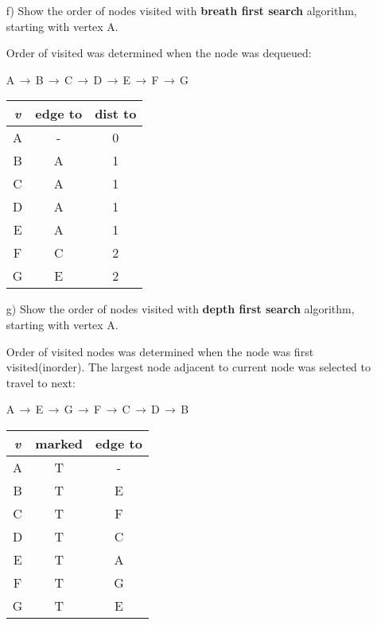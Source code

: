 \documentclass{article}
\begin{document}
\begin{itemize}
\begin{itemize}
        \item[f)] Show the order of nodes visited with \textbf{breath first search} algorithm, starting with vertex A.

        Order of visited was determined when the node was dequeued: 

        A$\,\to\,$B$\,\to\,$C$\,\to\,$D$\,\to\,$E$\,\to\,$F$\,\to\,$G

        \begin{centering}
            \begin{tabular}{|c|c|c|}
                \hline
                \emph{v} & edge to & dist to\\
                \hline
                A & - & 0\\
                \hline
                B & A & 1\\
                \hline
                C & A & 1\\
                \hline
                D & A & 1\\
                \hline
                E & A & 1\\
                \hline
                F & C & 2\\
                \hline
                G & E & 2\\
                \hline
            \end{tabular}
        \end{centering}
        
        \item[g)] Show the order of nodes visited with \textbf{depth first search} algorithm, starting with vertex A.

        Order of visited nodes was determined when the node was first visited(inorder).  The largest node adjacent to current node was selected to travel to next: 

        A$\,\to\,$E$\,\to\,$G$\,\to\,$F$\,\to\,$C$\,\to\,$D$\,\to\,$B

        \begin{centering}
            \begin{tabular}{|c|c|c|}
                \hline
                \emph{v} & marked & edge to\\
                \hline
                A & T & -\\
                \hline
                B & T & E\\
                \hline
                C & T & F\\
                \hline
                D & T & C\\
                \hline
                E & T & A\\
                \hline
                F & T & G\\
                \hline
                G & T & E\\
                \hline
            \end{tabular}
        \end{centering}
        
    \end{itemize}
\end{itemize}
\end{document}
